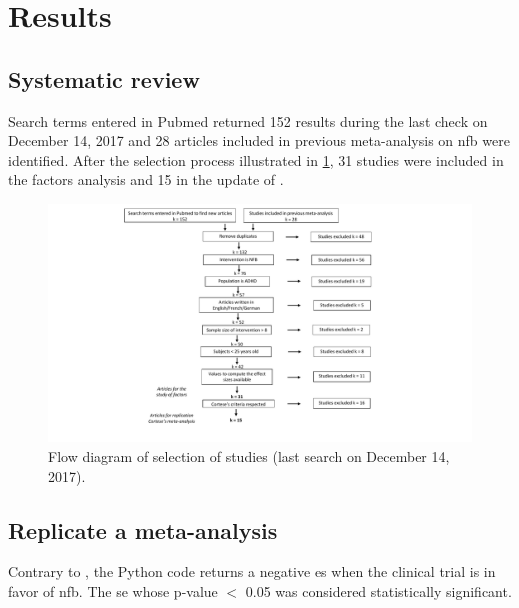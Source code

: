 


\section{Results}

\subsection{Systematic review}

Search terms entered in Pubmed returned 152 results during the last check on December 14, 2017 and 28 articles included in previous
 meta-analysis on \gls{nfb} were identified. After the selection process illustrated in \cref{Figure:systematic_review_workflow}, 
31 studies were included in the factors analysis and 15 in the update of \citet{Cortese2016}. 

\begin{figure}[h!]
  \centering
  \includegraphics[width=1.0\linewidth]{figures/meta_review_factors_analysis_how_studies_are_included_no_colors_2-columns_fitting_ima}
  \caption{Flow diagram of selection of studies (last search on December 14, 2017).}
  \label{Figure:systematic_review_workflow}
\end{figure}

\subsection{Replicate a meta-analysis}

Contrary to \citet{Cortese2016}, the Python code returns a negative \gls{es} when the clinical trial is in favor of \gls{nfb}. 
The \gls{se} whose p-value $<$ 0.05 was considered statistically significant. 

